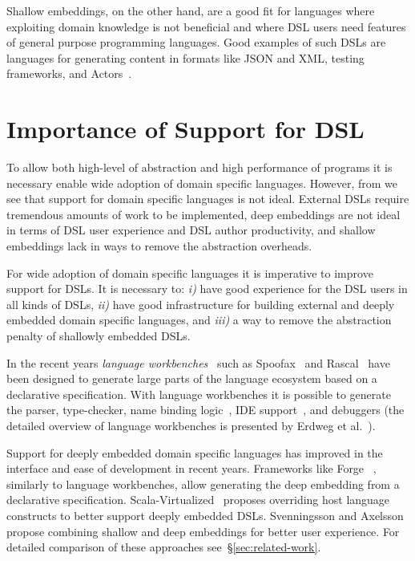 Shallow embeddings, on the other hand, are a good fit for languages where exploiting domain knowledge is not beneficial and where DSL users need features of general purpose programming
 languages. Good examples of such DSLs are languages for generating content in formats like JSON
 and XML, testing frameworks, and Actors~\cite{haller2009scala}.


\section{Importance of Support for DSL}
\label{sec:importance-of-language-support}

To allow both high-level of abstraction and high performance of programs it is necessary
 enable wide adoption of domain specific languages. However, from  we
 see that support for domain specific languages is not ideal. External DSLs require
 tremendous amounts of work to be implemented, deep embeddings are not ideal in terms
 of DSL user experience and DSL author productivity, and shallow embeddings lack in
 ways to remove the abstraction overheads.

 For wide adoption of domain specific languages it is imperative to improve support
 for DSLs. It is necessary to: \emph{i)} have good experience for the DSL users in all kinds of DSLs,
  \emph{ii)} have good infrastructure for building external and deeply embedded domain specific languages, and \emph{iii)} a way to remove the abstraction penalty of shallowly embedded DSLs.

In the recent years \emph{language workbenches}~\cite{fowler2005language} such as
 Spoofax~\cite{kats2010spoofax} and Rascal~\cite{klint2009rascal,van2011rascal} have been designed
  to generate large parts of the language ecosystem based on a declarative specification.
  With language workbenches it is possible to generate the parser, type-checker, name binding logic~\cite{konat2013declarative},
  IDE support~\cite{lorenzen2013modular}, and debuggers (the detailed overview of language workbenches is presented by Erdweg et al.~\cite{erdweg2013state}).

Support for deeply embedded domain specific languages has improved in the interface and
ease of development in recent years. Frameworks like Forge~\cite{forge}
, similarly to language workbenches, allow generating the deep embedding from a declarative
specification. Scala-Virtualized~\cite{rompf_scala-virtualized:_2009} proposes overriding
 host language constructs to better support deeply embedded DSLs. Svenningsson and Axelsson~\cite{svenningsson_combining_2012}
 propose combining shallow and deep embeddings for better user experience. For detailed
 comparison of these approaches see~\S \ref{sec:related-work}.

